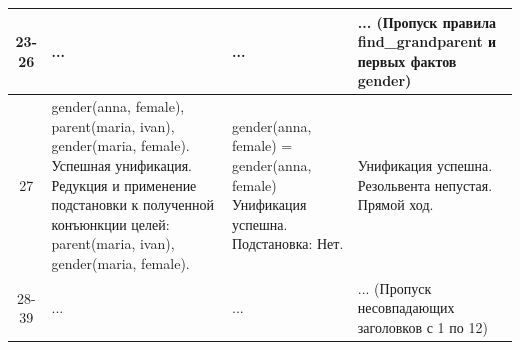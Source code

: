 \begin{tabularx}{\textwidth}{|c|>{\small}X|>{\small}X|>{\small}X|}
	23-26                                                                              &
	...                                                                                &
	...                                                                                &
	... (Пропуск правила find\_grandparent и первых фактов gender)                               \\
	\hline

	27                                                                                 &
	gender(anna, female), \newline
	parent(maria, ivan), \newline
	gender(maria, female). \newline
	Успешная унификация. \newline
	Редукция и применение подстановки к полученной конъюнкции целей: \newline
	parent(maria, ivan), \newline
	gender(maria, female).                                                             &
	gender(anna, female) = \newline
	gender(anna, female) \newline
	Унификация успешна. \newline
	Подстановка: \newline
	Нет.                                                                               &
	Унификация успешна. \newline
	Резольвента непустая. \newline
	Прямой ход.                                                                                  \\
	\hline

	28-39                                                                              &
	...                                                                                &
	...                                                                                &
	... (Пропуск несовпадающих заголовков с 1 по 12)                                             \\
	\hline


\end{tabularx}
